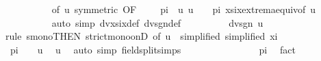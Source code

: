 \begin{isabellebody}
\ \ \ \ \ \ \ \ \isamarkupfalse%
\ {\isacharasterisk}{\kern0pt}{\isacharbrackleft}{\kern0pt}of\ u{\isacharcomma}{\kern0pt}\ symmetric{\isacharcomma}{\kern0pt}\ OF\ {\isacartoucheopen}{}\ {\isacharslash}{\kern0pt}\ {\isacharparenleft}{\kern0pt}{}\ {\isacharasterisk}{\kern0pt}\ pi{\isacharparenright}{\kern0pt}\ {\isacharless}{\kern0pt}\ u{\isacartoucheclose}\ {\isacartoucheopen}u\ {\isacharless}{\kern0pt}\ {}\ {\isacharslash}{\kern0pt}\ pi{\isacartoucheclose}{\isacharbrackright}{\kern0pt}\ xsix{\isacharunderscore}{\kern0pt}extrema{\isacharunderscore}{\kern0pt}equiv{\isacharbrackleft}{\kern0pt}of\ u{\isacharbrackright}{\kern0pt}\isanewline
\ \ \ \ \ \ \ \ \isamarkupfalse%
\ {\isacharparenleft}{\kern0pt}auto\ simp{\isacharcolon}{\kern0pt}\ dvxsix{\isacharunderscore}{\kern0pt}def\ dvsgn{\isacharunderscore}{\kern0pt}def{\isacharparenright}{\kern0pt}\isanewline
\ \ \ \ \ \ \isamarkupfalse%
\ \isamarkupfalse%
\ {\isachardoublequoteopen}dvsgn\ {\isacharparenleft}{\kern0pt}{}{\isacharslash}{\kern0pt}u{\isacharparenright}{\kern0pt}\ {\isacharless}{\kern0pt}\ {}{\isachardoublequoteclose}\isanewline
\ \ \ \ \ \ \isamarkupfalse%
{\isacharparenleft}{\kern0pt}rule\ smono{\isacharbrackleft}{\kern0pt}THEN\ strict{\isacharunderscore}{\kern0pt}mono{\isacharunderscore}{\kern0pt}onD{\isacharcomma}{\kern0pt}\ of\ {\isachardoublequoteopen}{}{\isacharslash}{\kern0pt}u{\isachardoublequoteclose}\ {\isasymxi}{\isacharcomma}{\kern0pt}\ simplified{\isacharcomma}{\kern0pt}\ simplified\ xi{\isacharparenleft}{\kern0pt}{}{\isacharparenright}{\kern0pt}{\isacharbrackright}{\kern0pt}{\isacharparenright}{\kern0pt}\isanewline
\ \ \ \ \ \ \ \ \isamarkupfalse%
\ {\isachardoublequoteopen}pi\ {\isacharless}{\kern0pt}\ {}\ {\isacharslash}{\kern0pt}\ u{\isachardoublequoteclose}\ \isamarkupfalse%
\ u\ \isamarkupfalse%
\ {\isacharparenleft}{\kern0pt}auto\ simp{\isacharcolon}{\kern0pt}\ field{\isacharunderscore}{\kern0pt}split{\isacharunderscore}{\kern0pt}simps{\isacharparenright}{\kern0pt}\isanewline
\ \ \ \ \ \ \ \ \isamarkupfalse%
\ {\isachardoublequoteopen}{\isasymxi}\ {\isacharasterisk}{\kern0pt}\ {}\ {\isacharless}{\kern0pt}\ {}\ {\isacharasterisk}{\kern0pt}\ pi{\isachardoublequoteclose}\ \isamarkupfalse%
\ fact\isanewline
\ \ \ \ \ \ \ \ \isamarkupfalse%

\end{isabellebody}
